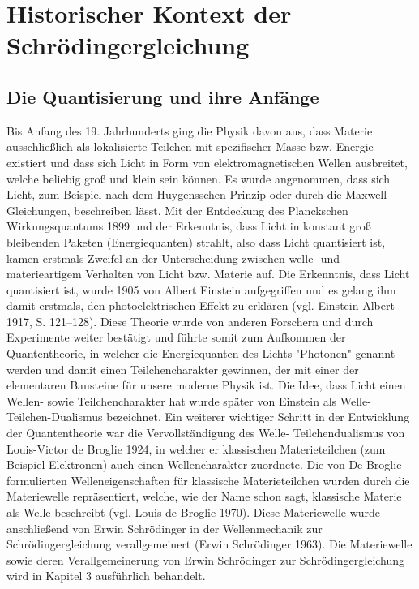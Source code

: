 \documentclass[12pt,oneside, a4paper]{scrbook}
\begin{document}
\chapter{Historischer Kontext der Schrödingergleichung}

\section{Die Quantisierung und ihre Anfänge}

Bis Anfang des 19. Jahrhunderts ging die Physik davon aus, dass Materie ausschließlich als lokalisierte Teilchen mit spezifischer Masse bzw. Energie existiert und dass sich Licht in Form von elektromagnetischen Wellen ausbreitet, welche beliebig groß und klein sein können. Es wurde angenommen, dass sich Licht, zum Beispiel nach dem Huygensschen Prinzip oder durch die Maxwell-Gleichungen, beschreiben lässt. Mit der Entdeckung des Planckschen Wirkungsquantums 1899 und der Erkenntnis, dass Licht in konstant groß bleibenden Paketen (Energiequanten) strahlt, also dass Licht quantisiert ist, kamen erstmals Zweifel an der Unterscheidung zwischen welle- und materieartigem Verhalten von Licht bzw. Materie auf. Die Erkenntnis, dass Licht quantisiert ist, wurde 1905 von Albert Einstein aufgegriffen und es gelang ihm damit erstmals, den photoelektrischen Effekt zu erklären (vgl. Einstein Albert 1917, S. 121–128).
Diese Theorie wurde von anderen Forschern und durch Experimente weiter bestätigt und führte somit zum Aufkommen der Quantentheorie, in welcher die Energiequanten des Lichts "Photonen" genannt werden und damit einen Teilchencharakter gewinnen, der mit einer der elementaren Bausteine für unsere moderne Physik ist.
Die Idee, dass Licht einen Wellen- sowie Teilchencharakter hat wurde später von Einstein als Welle-Teilchen-Dualismus bezeichnet.
Ein weiterer wichtiger Schritt in der Entwicklung der Quantentheorie war die Vervollständigung des Welle- Teilchendualismus von Louis-Victor de Broglie 1924, in welcher er klassischen Materieteilchen (zum Beispiel Elektronen) auch einen Wellencharakter zuordnete.
Die von De Broglie formulierten Welleneigenschaften für klassische Materieteilchen wurden durch die Materiewelle repräsentiert, welche, wie der Name schon sagt, klassische Materie als Welle beschreibt (vgl. Louis de Broglie 1970). Diese Materiewelle wurde anschließend von Erwin Schrödinger in der Wellenmechanik zur Schrödingergleichung verallgemeinert (Erwin Schrödinger 1963).
Die Materiewelle sowie deren Verallgemeinerung von Erwin Schrödinger zur Schrödingergleichung wird in Kapitel 3 ausführlich behandelt. 
\end{document}

